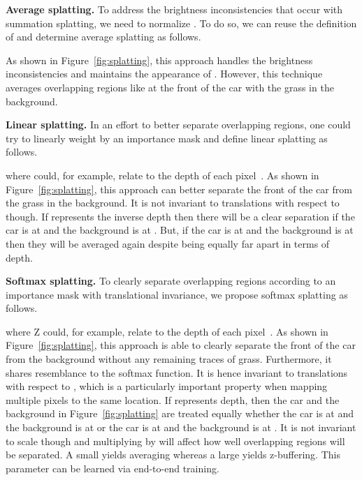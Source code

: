 \documentclass[10pt,twocolumn,letterpaper]{article}
\begin{document}
\vspace{0.05in}
\noindent\textbf{Average splatting.} To address the brightness inconsistencies that occur with summation splatting, we need to normalize . To do so, we can reuse the definition of  and determine average splatting  as follows.

As shown in Figure~\ref{fig:splatting}, this approach handles the brightness inconsistencies and maintains the appearance of . However, this technique averages overlapping regions like at the front of the car with the grass in the background.

\vspace{0.05in}
\noindent\textbf{Linear splatting.} In an effort to better separate overlapping regions, one could try to linearly weight  by an importance mask  and define linear splatting  as follows.

where  could, for example, relate to the depth of each pixel~\cite{Bao_CVPR_2019}. As shown in Figure~\ref{fig:splatting}, this approach can better separate the front of the car from the grass in the background. It is not invariant to translations with respect to  though. If  represents the inverse depth then there will be a clear separation if the car is at  and the background is at . But, if the car is at  and the background is at  then they will be averaged again despite being equally far apart in terms of depth.

\noindent\textbf{Softmax splatting.} To clearly separate overlapping regions according to an importance mask  with translational invariance, we propose softmax splatting  as follows.

where Z could, for example, relate to the depth of each pixel~\cite{Bao_CVPR_2019}. As shown in Figure~\ref{fig:splatting}, this approach is able to clearly separate the front of the car from the background without any remaining traces of grass. Furthermore, it shares resemblance to the softmax function. It is hence invariant to translations  with respect to , which is a particularly important property when mapping multiple pixels to the same location. If  represents depth, then the car and the background in Figure~\ref{fig:splatting} are treated equally whether the car is at  and the background is at  or the car is at  and the background is at . It is not invariant to scale though and multiplying  by  will affect how well overlapping regions will be separated. A small  yields averaging whereas a large  yields z-buffering. This parameter can be learned via end-to-end training.
\end{document}
